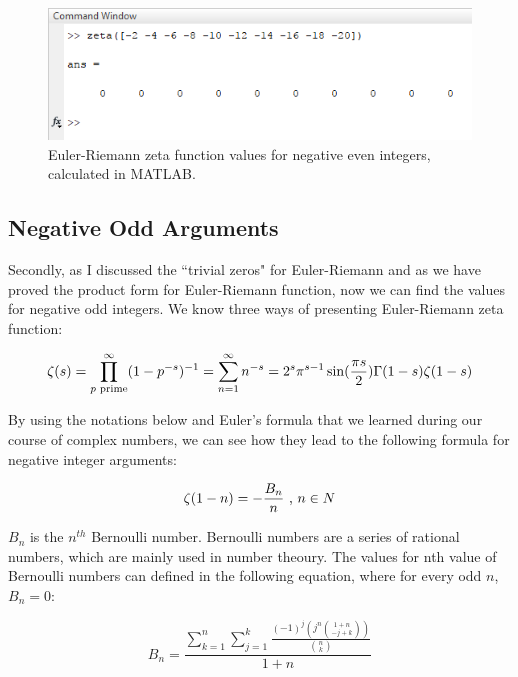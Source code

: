\documentclass[a4paper]{article}
\begin{document}
\begin{figure}[h!]
  \includegraphics[width=\textwidth]{zerosv.png}
\begin{center}
  \caption{Euler-Riemann zeta
function values for
negative even integers,
calculated in MATLAB.}
  \label{fig:zerosv}
\end{center}
\end{figure}

\subsection{Negative Odd Arguments}

Secondly, as I discussed the “trivial zeros" for Euler-Riemann and as we have proved the product
form for Euler-Riemann function, now we can find the values for negative odd integers. We know
three ways of presenting Euler-Riemann zeta function:

\begin{equation}
  \zeta(s)=\prod_{p \text{ prime}}^{\infty} (1-p^{-s})^{-1}=\sum_{n=1}^{\infty} n^{-s}=2^s\pi^{s-1}\sin(\frac{\pi s}{2})\Gamma(1-s)\zeta(1-s)\\
  \end{equation}

By using the notations below and Euler's formula that we learned during our course of complex
numbers, we can see how they lead\cite{Bern} to the following formula
for negative integer arguments:

\begin{equation}
  \label{bnn}
  \zeta(1-n)=-\frac{B_n}{n} \text{ , $n\in N$}\\
  \end{equation}

$B_n$ is the $n^{th}$ Bernoulli number. Bernoulli numbers are a series of rational numbers, which are
mainly used in number theoury. The values for nth value of Bernoulli numbers can defined in the
following equation\cite{BernSeq}, where for
every odd $n$, $B_n=0$:

\begin{equation*}
  B_n=\frac{\sum_{k=1}^{n} \sum_{j=1}^{k} \frac{(-1)^j (j^n \binom{1+n}{-j+k}) }{\binom{n}{k}} }{1+n}
  \end{equation*}
\end{document}
